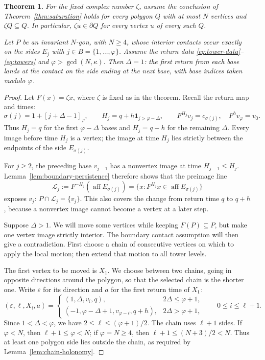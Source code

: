 \documentclass[11pt,a4paper]{article}
\DeclareMathOperator{\aff}{aff}
\newtheorem{theorem}{Theorem}[section]
\theoremstyle{definition}
\theoremstyle{remark}
\numberwithin{equation}{section}
\begin{document}
\begin{theorem}\label{thm:no-skipping}
For the fixed complex number $\zeta$, assume the conclusion of Theorem~\ref{thm:saturation} holds for every polygon $Q$ with at most $N$ vertices and $\zeta Q\subseteq Q$. In particular, $\zeta u\in\partial Q$ for every vertex $u$ of every such $Q$.

Let $P$ be an invariant $N$-gon, with $N\ge4$, whose interior contacts occur exactly on the sides $E_j$ with $j\in B=\{1,\ldots,\varphi\}$. Assume the return data \eqref{eq:tower-data}--\eqref{eq:towers} and $\varphi>\gcd(N,\kappa)$. Then $\Delta=1$: the first return from each base lands at the contact on the side ending at the next base, with base indices taken modulo $\varphi$.
\end{theorem}
\begin{proof}
Let $F(x)=\zeta x$, where $\zeta$ is fixed as in the theorem. Recall the return map and times:
\[
 \sigma(j)=1+[j+\Delta-1]_\varphi,\qquad
 H_j=q+h\mathbf1_{j>\varphi-\Delta},\qquad
 F^{H_j}v_j=c_{\sigma(j)},\quad F^hv_\varphi=v_0.
\]
Thus $H_j=q$ for the first $\varphi-\Delta$ bases and $H_j=q+h$ for the remaining $\Delta$. Every image before time $H_j$ is a vertex; the image at time $H_j$ lies strictly between the endpoints of the side $E_{\sigma(j)}$.

For $j\ge2$, the preceding base $v_{j-1}$ has a nonvertex image at time $H_{j-1}\le H_j$. Lemma~\ref{lem:boundary-persistence} therefore shows that the preimage line
\[
 \mathcal L_j:=F^{-H_j}(\aff E_{\sigma(j)})
       =\{x:F^{H_j}x\in\aff E_{\sigma(j)}\}
\]
exposes $v_j$: $P\cap\mathcal L_j=\{v_j\}$. This also covers the change from return time $q$ to $q+h$, because a nonvertex image cannot become a vertex at a later step.

Suppose $\Delta>1$. We will move some vertices while keeping $F(P)\subseteq P$, but make one vertex image strictly interior. The boundary contact assumption will then give a contradiction. First choose a chain of consecutive vertices on which to apply the local motion; then extend that motion to all tower levels.

The first vertex to be moved is $X_1$. We choose between two chains, going in opposite directions around the polygon, so that the selected chain is the shorter one. Write $\varepsilon$ for its direction and $a$ for the first return time of $X_1$:
\[
 (\varepsilon,\ell,X_i,a)=
 \begin{cases}
 (1,\Delta,v_i,q),&2\Delta\le\varphi+1,\\
 (-1,\varphi-\Delta+1,v_{\varphi-i},q+h),&2\Delta>\varphi+1,
 \end{cases}
 \qquad 0\le i\le\ell+1.
\]
Since $1<\Delta<\varphi$, we have $2\le\ell\le(\varphi+1)/2$. The chain uses $\ell+1$ sides. If $\varphi<N$, then $\ell+1\le\varphi<N$; if $\varphi=N\ge4$, then $\ell+1\le(N+3)/2<N$. Thus at least one polygon side lies outside the chain, as required by Lemma~\ref{lem:chain-holonomy}.


\end{proof}
\end{document}
